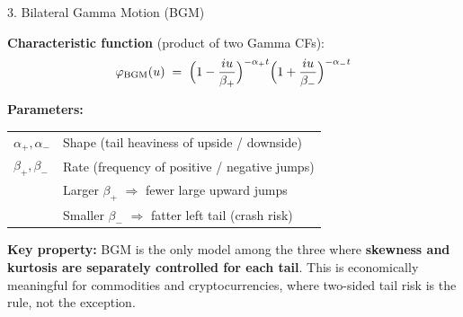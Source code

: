 \documentclass[aspectratio=169]{beamer}
\begin{document}
\begin{frame}{3. Bilateral Gamma Motion (BGM)}

\textbf{Characteristic function} (product of two Gamma CFs):
\[
\varphi_{\text{BGM}}(u) \;=\;
\Bigl(1 - \frac{iu}{\beta_+}\Bigr)^{-\alpha_+ t}
\Bigl(1 + \frac{iu}{\beta_-}\Bigr)^{-\alpha_- t}
\]

\vspace{0.2cm}
\textbf{Parameters:}
\quad
\begin{tabular}{@{}ll@{}}\toprule
$\alpha_+, \alpha_-$ & Shape (tail heaviness of upside / downside)\\
$\beta_+, \beta_-$ & Rate (frequency of positive / negative jumps)\\
& \quad Larger $\beta_+$ $\Rightarrow$ fewer large upward jumps\\
& \quad Smaller $\beta_-$ $\Rightarrow$ fatter left tail (crash risk)\\\bottomrule
\end{tabular}

\vspace{0.2cm}
\textbf{Key property:} BGM is the only model among the three where \textbf{skewness and kurtosis are separately controlled for each tail}. This is economically meaningful for commodities and cryptocurrencies, where two-sided tail risk is the rule, not the exception.

\end{frame}
\end{document}
